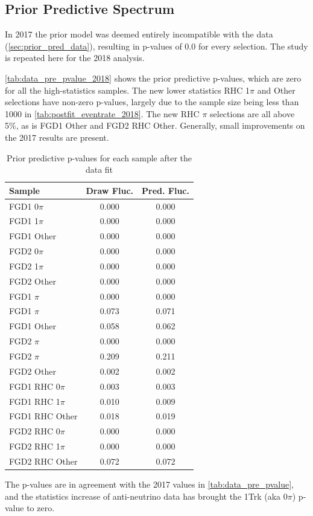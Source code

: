 \subsection{Prior Predictive Spectrum}
In 2017 the prior model was deemed entirely incompatible with the data (\autoref{sec:prior_pred_data}), resulting in p-values of 0.0 for every selection. The study is repeated here for the 2018 analysis.

\autoref{tab:data_pre_pvalue_2018} shows the prior predictive p-values, which are zero for all the high-statistics samples. The new lower statistics RHC 1$\pi$ and Other selections have non-zero p-values, largely due to the sample size being less than 1000 in \autoref{tab:postfit_eventrate_2018}. The new RHC $\pi$ selections are all above 5\%, as is FGD1 \numubar Other and FGD2 \numu RHC Other. Generally, small improvements on the 2017 results are present.
\begin{table}[h]
	\centering
	\begin{tabular}{l | c c }
		\hline \hline
		Sample & Draw Fluc. & Pred. Fluc. \\
		\hline
		FGD1 0$\pi$ & 0.000 & 0.000 \\
		FGD1 1$\pi$ & 0.000 & 0.000 \\
		FGD1 Other  & 0.000 & 0.000 \\
		\hline
		FGD2 0$\pi$ & 0.000 & 0.000 \\
		FGD2 1$\pi$ & 0.000 & 0.000 \\
		FGD2 Other  & 0.000 & 0.000 \\
		\hline
		FGD1 \numubar 0$\pi$ & 0.000 & 0.000 \\
		FGD1 \numubar 1$\pi$ & 0.073 & 0.071 \\
		FGD1 \numubar Other  & 0.058 & 0.062 \\
		\hline
		FGD2 \numubar 0$\pi$ & 0.000 & 0.000 \\
		FGD2 \numubar 1$\pi$ & 0.209 & 0.211 \\
		FGD2 \numubar Other  & 0.002 & 0.002 \\
		\hline
		FGD1 \numu RHC 0$\pi$ & 0.003 & 0.003 \\
		FGD1 \numu RHC 1$\pi$ & 0.010 & 0.009 \\
		FGD1 \numu RHC Other  & 0.018 & 0.019 \\
		\hline
		FGD2 \numu RHC 0$\pi$ & 0.000 & 0.000 \\
		FGD2 \numu RHC 1$\pi$ & 0.000 & 0.000 \\
		FGD2 \numu RHC Other  & 0.072 & 0.072 \\
		\hline
		\hline
	\end{tabular}
	\caption{Prior predictive p-values for each sample after the data fit}
	\label{tab:data_pre_pvalue_2018}
\end{table}
The p-values are in agreement with the 2017 values in \autoref{tab:data_pre_pvalue}, and the statistics increase of anti-neutrino data has brought the 1Trk (aka 0$\pi$) p-value to zero.

